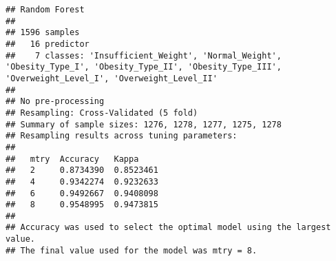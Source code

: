 \documentclass[
]{article}
\newenvironment{Shaded}{\begin{snugshade}}{\end{snugshade}}
\newcommand{\AttributeTok}[1]{\textcolor[rgb]{0.13,0.29,0.53}{#1}}
\newcommand{\DecValTok}[1]{\textcolor[rgb]{0.00,0.00,0.81}{#1}}
\newcommand{\FunctionTok}[1]{\textcolor[rgb]{0.13,0.29,0.53}{\textbf{#1}}}
\newcommand{\NormalTok}[1]{#1}
\newcommand{\OtherTok}[1]{\textcolor[rgb]{0.56,0.35,0.01}{#1}}
\newcommand{\SpecialCharTok}[1]{\textcolor[rgb]{0.81,0.36,0.00}{\textbf{#1}}}
\newcommand{\StringTok}[1]{\textcolor[rgb]{0.31,0.60,0.02}{#1}}
\begin{document}
\begin{verbatim}
## Random Forest 
## 
## 1596 samples
##   16 predictor
##    7 classes: 'Insufficient_Weight', 'Normal_Weight', 'Obesity_Type_I', 'Obesity_Type_II', 'Obesity_Type_III', 'Overweight_Level_I', 'Overweight_Level_II' 
## 
## No pre-processing
## Resampling: Cross-Validated (5 fold) 
## Summary of sample sizes: 1276, 1278, 1277, 1275, 1278 
## Resampling results across tuning parameters:
## 
##   mtry  Accuracy   Kappa    
##   2     0.8734390  0.8523461
##   4     0.9342274  0.9232633
##   6     0.9492667  0.9408098
##   8     0.9548995  0.9473815
## 
## Accuracy was used to select the optimal model using the largest value.
## The final value used for the model was mtry = 8.
\end{verbatim}

\begin{Shaded}
\end{Shaded}
\end{document}
